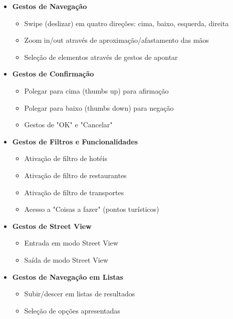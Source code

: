 \begin{itemize}
    \item \textbf{Gestos de Navegação}
    \begin{itemize}
        \item Swipe (deslizar) em quatro direções: cima, baixo, esquerda, direita
        \item Zoom in/out através de aproximação/afastamento das mãos
        \item Seleção de elementos através de gestos de apontar
    \end{itemize}

    \item \textbf{Gestos de Confirmação}
    \begin{itemize}
        \item Polegar para cima (thumbs up) para afirmação
        \item Polegar para baixo (thumbs down) para negação
        \item Gestos de "OK" e "Cancelar"
    \end{itemize}

    \item \textbf{Gestos de Filtros e Funcionalidades}
    \begin{itemize}
        \item Ativação de filtro de hotéis
        \item Ativação de filtro de restaurantes
        \item Ativação de filtro de transportes
        \item Acesso a "Coisas a fazer" (pontos turísticos)
    \end{itemize}

    \item \textbf{Gestos de Street View}
    \begin{itemize}
        \item Entrada em modo Street View
        \item Saída de modo Street View
    \end{itemize}

    \item \textbf{Gestos de Navegação em Listas}
    \begin{itemize}
        \item Subir/descer em listas de resultados
        \item Seleção de opções apresentadas
    \end{itemize}
\end{itemize}

